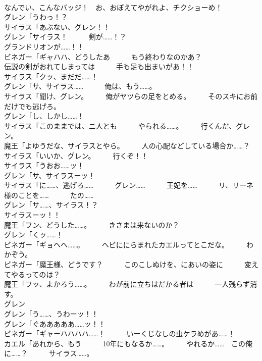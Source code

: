 \documentclass[8pt]{extreport}
\begin{document}
\begin{CJK}{UTF8}{min}
\\	なんでい、こんなバッジ！　お、おぼえてやがれよ、チクショーめ！	
\\	グレン「うわっ！？	
\\	サイラス「あぶない、グレン！！	
\\	グレン「サイラス！　　　剣が……！？	
\\	グランドリオンが……！！	
\\	ビネガー「ギャハハ、どうしたあ　　　もう終わりなのかあ？	
\\	伝説の剣がおれてしまっては　　　手も足も出まいがあ！！	
\\	サイラス「クッ、まだだ……！	
\\	グレン「サ、サイラス……　　　俺は、もう……。	
\\	サイラス「聞け、グレン。　　　俺がヤツらの足をとめる。　　　そのスキにお前だけでも逃げろ。	
\\	グレン「し、しかし……！	
\\	サイラス「このままでは、ニ人とも　　　やられる……。　　　行くんだ、グレン。	
\\	魔王「よゆうだな、サイラスとやら。　　　人の心配などしている場合か……？	
\\	サイラス「いいか、グレン。　　　行くぞ！！	
\\	サイラス「うおお……ッ！	
\\	グレン「サ、サイラスーッ！	
\\	サイラス「に……、逃げろ……　　　グレン……　　　王妃を……　　　リ、リーネ様のことを……　　　たの……	
\\	グレン「サ……、サイラス！？	
\\	サイラスーッ！！	
\\	魔王「フン、どうした……。　　　きさまは来ないのか？	
\\	グレン「くッ……！	
\\	ビネガー「ギョヘヘ……。　　　ヘビににらまれたカエルってとこだな。　　　わかぞう。	
\\	ビネガー「魔王様、どうです？　　　このこしぬけを、にあいの姿に　　　変えてやるってのは？	
\\	魔王「フッ、よかろう……。　　　わが前に立ちはだかる者は　　　一人残らず消す。	
\\	グレン
\\	グレン「う……、うわーッ！！	
\\	グレン「ぐあああああ……ッ！！	
\\	ビネガー「ギャーハハハハ……！　　　いーくじなしの虫ケラめがあ……！	
\\	カエル「あれから、もう　　　10年にもなるか……。　　　やれるか……　この俺に……？　　　サイラス……。	

\end{CJK}
\end{document}
